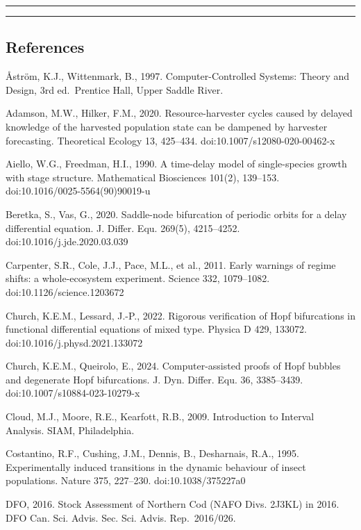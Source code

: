 \documentclass[11pt]{article}
\begin{document}
\begin{center}\rule{0.5\linewidth}{0.5pt}\end{center}

\begin{center}\rule{0.5\linewidth}{0.5pt}\end{center}

\subsection{References}\label{references}

\AA{}str\"om, K.J., Wittenmark, B., 1997. Computer-Controlled Systems: Theory
and Design, 3rd ed.~Prentice Hall, Upper Saddle River.

Adamson, M.W., Hilker, F.M., 2020. Resource-harvester cycles caused by
delayed knowledge of the harvested population state can be dampened by
harvester forecasting. Theoretical Ecology 13, 425--434.
doi:10.1007/s12080-020-00462-x

Aiello, W.G., Freedman, H.I., 1990. A time-delay model of single-species
growth with stage structure. Mathematical Biosciences 101(2), 139--153.
doi:10.1016/0025-5564(90)90019-u

Beretka, S., Vas, G., 2020. Saddle-node bifurcation of periodic orbits
for a delay differential equation. J. Differ. Equ. 269(5), 4215--4252.
doi:10.1016/j.jde.2020.03.039

Carpenter, S.R., Cole, J.J., Pace, M.L., et al., 2011. Early warnings of
regime shifts: a whole-ecosystem experiment. Science 332, 1079--1082.
doi:10.1126/science.1203672

Church, K.E.M., Lessard, J.-P., 2022. Rigorous verification of Hopf
bifurcations in functional differential equations of mixed type. Physica
D 429, 133072. doi:10.1016/j.physd.2021.133072

Church, K.E.M., Queirolo, E., 2024. Computer-assisted proofs of Hopf
bubbles and degenerate Hopf bifurcations. J. Dyn. Differ. Equ. 36,
3385--3439. doi:10.1007/s10884-023-10279-x

Cloud, M.J., Moore, R.E., Kearfott, R.B., 2009. Introduction to Interval
Analysis. SIAM, Philadelphia.

Costantino, R.F., Cushing, J.M., Dennis, B., Desharnais, R.A., 1995.
Experimentally induced transitions in the dynamic behaviour of insect
populations. Nature 375, 227--230. doi:10.1038/375227a0

DFO, 2016. Stock Assessment of Northern Cod (NAFO Divs. 2J3KL) in 2016.
DFO Can. Sci. Advis. Sec. Sci. Advis. Rep.~2016/026.
\end{document}
